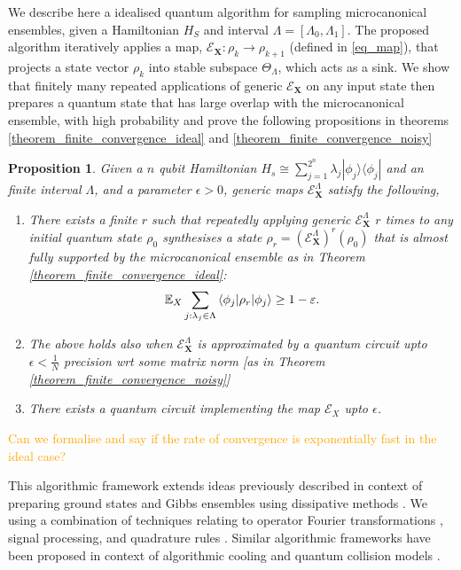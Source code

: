 \documentclass[10pt]{amsart}
\newtheorem{proposition}{Proposition}
\newcommand{\E}{\mathcal{E}}
\newcommand{\X}{\textbf{X}}
\newcommand{\dmat}[1]{{| #1 \rangle \langle #1 |}}
\begin{document}
We describe here a idealised quantum algorithm for sampling microcanonical ensembles, given a Hamiltonian $H_S$ and interval $\Lambda = [\Lambda_0,\Lambda_1]$. The proposed algorithm iteratively applies a map,  $\E_\X: \rho_k \rightarrow \rho_{k+1}$ (defined in \eqref{eq_map}), that projects a state vector $\rho_k$ into stable subspace $\Theta_{\Lambda}$, which acts as a sink. We show that finitely many repeated applications of generic $\E_\X$ on any input state then prepares a quantum state that has large overlap with the microcanonical ensemble, with high probability and prove the following propositions in theorems \ref{theorem_finite_convergence_ideal} and \ref{theorem_finite_convergence_noisy}

\newpage
\begin{proposition}
    Given a $n$ qubit Hamiltonian $H_s \cong \sum_{j=1}^{2^n}\lambda_j\dmat{\phi_j}$ and an finite interval $\Lambda$, and a parameter $\epsilon>0$, generic maps $\E_\X^{\Lambda}$ satisfy the following, 
    
    \begin{enumerate}
        \item There exists a finite $r$ such that repeatedly applying generic $\E_\X^{\Lambda}$
    $r$ times to any initial quantum state $\rho_0$ synthesises a state $\rho_r = (\E_\X^{\Lambda})^r(\rho_0)$ that is almost fully supported by the microcanonical ensemble as in Theorem \ref{theorem_finite_convergence_ideal}:
    $$
\mathbb{E}_X \sum_{j: \lambda_j \in \Lambda} \braket{\phi_j | \rho_r | \phi_j} \geq 1 - \varepsilon.$$
 
    \item The above holds also when $\E_\X^{\Lambda}$ is approximated by a quantum circuit upto $\epsilon< \frac{1}{N}$ precision wrt some matrix norm  [as in Theorem \ref{theorem_finite_convergence_noisy}]     
    \item There exists a quantum circuit implementing the map $\mathcal{E}_X$ upto $\epsilon$. 
        \end{enumerate}
\end{proposition}
\textcolor{orange}{Can we formalise and say if the rate of convergence is exponentially fast in the ideal case? }

This algorithmic framework extends ideas previously described in context of preparing ground states \cite{} and Gibbs ensembles \cite{} using dissipative methods \cite{}. We using a combination of techniques relating to operator Fourier transformations \cite{}, signal processing\cite{}, and quadrature rules \cite{}. Similar algorithmic frameworks have been proposed in context of algorithmic cooling \cite{} and quantum collision models \cite{}. 
\end{document}
